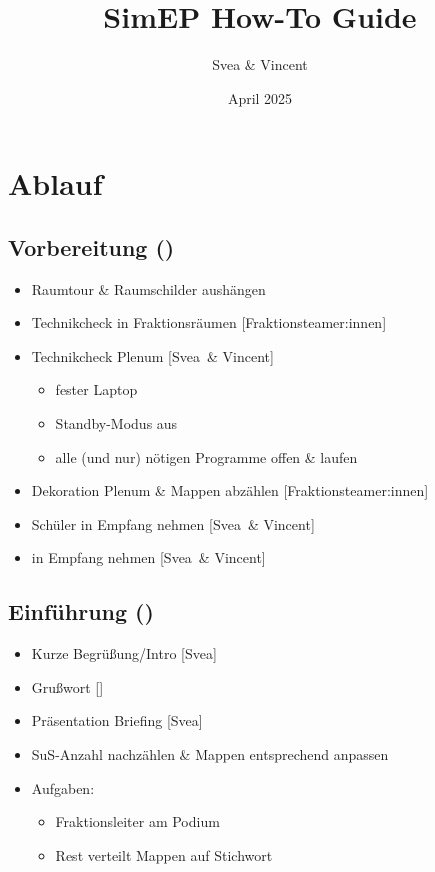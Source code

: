 \documentclass{article}
\title{SimEP How-To Guide}
\author{Svea \& Vincent}
\date{April 2025}
\newcommand{\KOM}{Svea}
\newcommand{\EP}{Vincent}
\begin{document}
	\section{Ablauf}
	\subsection{Vorbereitung (\timeVorb)}
	\begin{itemize}
		\item Raumtour \& Raumschilder aushängen
        \item Technikcheck in Fraktionsräumen [Fraktionsteamer:innen]
		\item Technikcheck Plenum [\KOM\ \& \EP]
		\begin{itemize}
			\item fester Laptop
			\item Standby-Modus aus
			\item alle (und nur) nötigen Programme offen \& laufen
		\end{itemize}
		\item Dekoration Plenum \& Mappen abzählen [Fraktionsteamer:innen]
		\item Schüler in Empfang nehmen [\KOM\ \& \EP]
		\item \politiker in Empfang nehmen [\KOM\ \& \EP]		
	\end{itemize}
	
	\subsection{Einführung (\timeEinf)}
	\begin{itemize}
		\item Kurze Begrüßung/Intro [\KOM]
		\item Grußwort [\politiker]
		\item Präsentation Briefing [\KOM]
        \item SuS-Anzahl nachzählen \& Mappen entsprechend anpassen
        \item Aufgaben:
        \begin{itemize}
            \item Fraktionsleiter am Podium
            \item Rest verteilt Mappen auf Stichwort
        \end{itemize}
    \end{itemize}
	
\end{document}
